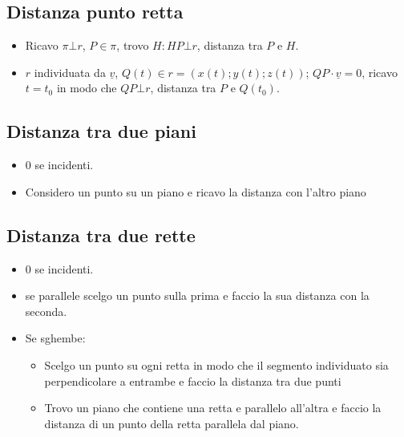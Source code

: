 \subsection{Distanza punto retta}
\begin{itemize}
\item Ricavo $\pi\bot r$, $P\in\pi$, trovo $H:HP\bot r$, distanza tra $P$ e $H$.
\item $r$ individuata da $\underline{v}$, $Q(t)\in r=(x(t);y(t);z(t))$; $QP\cdot\underline{v}=0$, ricavo $t=t_0$ in modo che $QP\bot r$, distanza tra $P$ e $Q(t_0)$.
\end{itemize}
\subsection{Distanza tra due piani}
\begin{itemize}
\item 0 se incidenti.
\item Considero un punto su un piano e ricavo la distanza con l'altro piano
\end{itemize}
\subsection{Distanza tra due rette}
\begin{itemize}
\item 0 se incidenti.
\item se parallele scelgo un punto sulla prima e faccio la sua distanza con la seconda.
\item Se sghembe:
\begin{itemize}
\item Scelgo un punto su ogni retta in modo che il segmento individuato sia perpendicolare a entrambe e faccio la distanza tra due punti
\item Trovo un piano che contiene una retta e parallelo all'altra e faccio la distanza di un punto della retta parallela dal piano.
\end{itemize}
\end{itemize}